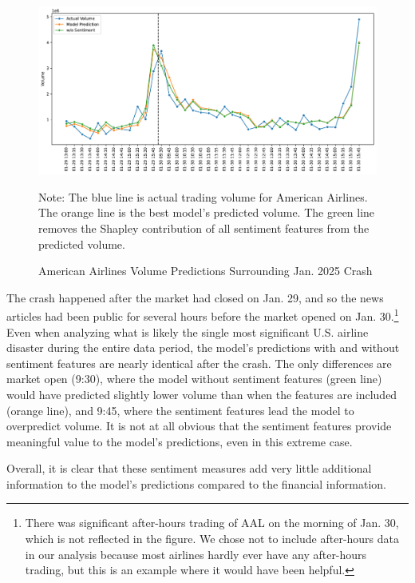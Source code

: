 \documentclass[12pt]{article}
\begin{document}
\begin{figure}[H]
    \centering
    \caption{American Airlines Volume Predictions Surrounding Jan. 2025 Crash}
    \includegraphics[width=\linewidth]{../Output/shap_aal_crash.pdf}
    \begin{minipage}{0.95\linewidth}
        \footnotesize
        \singlespacing
        Note: The blue line is actual trading volume for American Airlines. The orange line is the best model's predicted volume. The green line removes the Shapley contribution of all sentiment features from the predicted volume.
    \end{minipage}
    \label{fig:shapley_aal_crash}
\end{figure}

The crash happened after the market had closed on Jan. 29, and so the news articles had been public for several hours before the market opened on Jan. 30.\footnote{There was significant after-hours trading of AAL on the morning of Jan. 30, which is not reflected in the figure. We chose not to include after-hours data in our analysis because most airlines hardly ever have any after-hours trading, but this is an example where it would have been helpful.} Even when analyzing what is likely the single most significant U.S. airline disaster during the entire data period, the model's predictions with and without sentiment features are nearly identical after the crash. The only differences are market open (9:30), where the model without sentiment features (green line) would have predicted slightly lower volume than when the features are included (orange line), and 9:45, where the sentiment features lead the model to overpredict volume. It is not at all obvious that the sentiment features provide meaningful value to the model's predictions, even in this extreme case.

Overall, it is clear that these sentiment measures add very little additional information to the model's predictions compared to the financial information.
\end{document}
